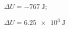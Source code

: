 \documentclass[10pt]{article}
\begin{document}
\begin{solution}
  \begin{enumerate*}
    \item $\Delta U = \SI{-767}{\joule}$; \item $\Delta U = \SI{6.25e3}{\joule}$
  \end{enumerate*}
\end{solution}
%
%
%
%
%
%
\end{document}
